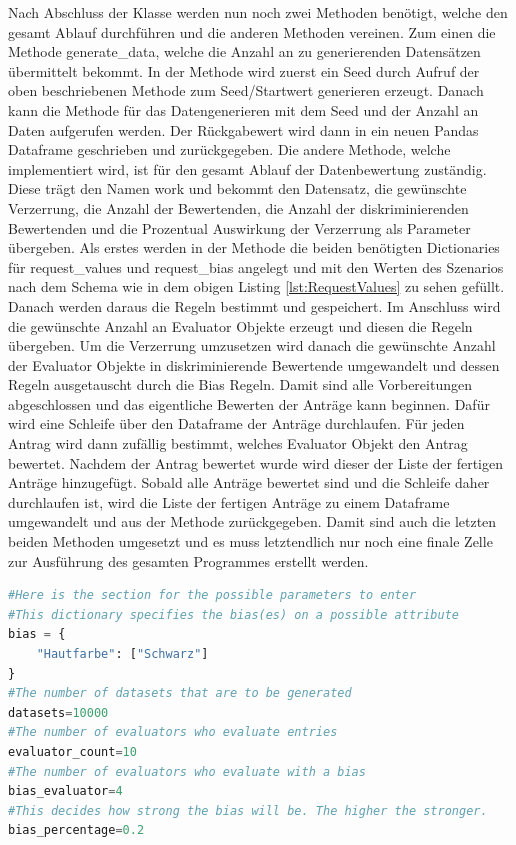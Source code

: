 \begin{onehalfspace}
Nach Abschluss der Klasse werden nun noch zwei Methoden benötigt, welche den gesamt Ablauf durchführen und die anderen Methoden vereinen. Zum einen die Methode \glqq{}generate\_data\grqq{}, welche die Anzahl an zu generierenden Datensätzen übermittelt bekommt. In der Methode wird zuerst ein Seed durch Aufruf der oben beschriebenen Methode zum Seed/Startwert generieren erzeugt. Danach kann die Methode für das Datengenerieren mit dem Seed und der Anzahl an Daten aufgerufen werden. Der Rückgabewert wird dann in ein neuen Pandas Dataframe geschrieben und zurückgegeben. Die andere Methode, welche implementiert wird, ist für den gesamt Ablauf der Datenbewertung zuständig. Diese trägt den Namen \glqq{}work\grqq{} und bekommt den Datensatz, die gewünschte Verzerrung, die Anzahl der Bewertenden, die Anzahl der diskriminierenden Bewertenden und die Prozentual Auswirkung der Verzerrung als Parameter übergeben. Als erstes werden in der Methode die beiden benötigten Dictionaries für \glqq{}request\_values und request\_bias\grqq{} angelegt und mit den Werten des Szenarios nach dem Schema wie in dem obigen Listing \ref{lst:RequestValues} zu sehen gefüllt. Danach werden daraus die Regeln bestimmt und gespeichert. Im Anschluss wird die gewünschte Anzahl an \glqq{}Evaluator\grqq{} Objekte erzeugt und diesen die Regeln übergeben. Um die Verzerrung umzusetzen wird danach die gewünschte Anzahl der \glqq{}Evaluator\grqq{} Objekte in diskriminierende Bewertende umgewandelt und dessen Regeln ausgetauscht durch die Bias Regeln. Damit sind alle Vorbereitungen abgeschlossen und das eigentliche Bewerten der Anträge kann beginnen. Dafür wird eine Schleife über den Dataframe der Anträge durchlaufen. Für jeden Antrag wird dann zufällig bestimmt, welches \glqq{}Evaluator\grqq{} Objekt den Antrag bewertet. Nachdem der Antrag bewertet wurde wird dieser der Liste der fertigen Anträge hinzugefügt. Sobald alle Anträge bewertet sind und die Schleife daher durchlaufen ist, wird die Liste der fertigen Anträge zu einem Dataframe umgewandelt und aus der Methode zurückgegeben. 
Damit sind auch die letzten beiden Methoden umgesetzt und es muss letztendlich nur noch eine finale Zelle zur Ausführung des gesamten Programmes erstellt werden.\\
\begin{lstlisting}[language=Python,label={lst:Sz1finalCell},caption=Letzte Zelle des Szenario der Bewährungsantrag für die Interaktion des Benutzenden]
#Here is the section for the possible parameters to enter
#This dictionary specifies the bias(es) on a possible attribute
bias = {
    "Hautfarbe": ["Schwarz"]
}
#The number of datasets that are to be generated
datasets=10000
#The number of evaluators who evaluate entries
evaluator_count=10
#The number of evaluators who evaluate with a bias
bias_evaluator=4
#This decides how strong the bias will be. The higher the stronger.
bias_percentage=0.2


\end{lstlisting}
\end{onehalfspace}

